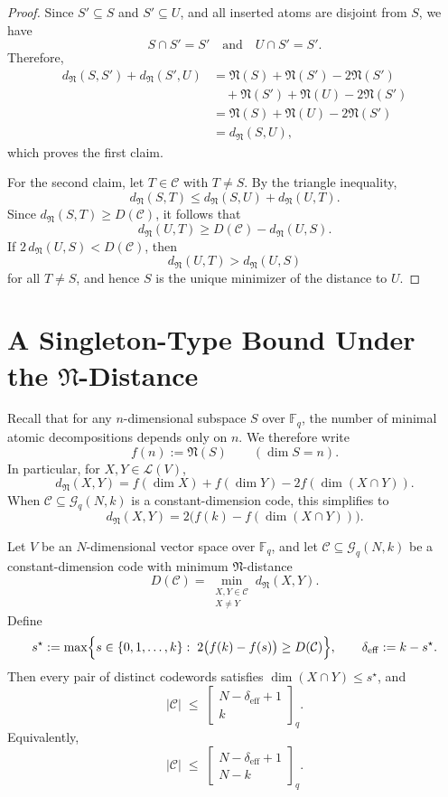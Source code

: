 \documentclass{svproc}
\begin{document}
\begin{proof}
Since $S' \subseteq S$ and $S' \subseteq U$, and all inserted atoms are disjoint
from $S$, we have
\[
S \cap S' = S' \quad\text{and}\quad U \cap S' = S'.
\]
Therefore,
\begin{align*}
d_{\mathfrak N}(S,S') + d_{\mathfrak N}(S',U)
&= \mathfrak N(S) + \mathfrak N(S') - 2\mathfrak N(S') \\
&\quad + \mathfrak N(S') + \mathfrak N(U) - 2\mathfrak N(S') \\
&= \mathfrak N(S) + \mathfrak N(U) - 2\mathfrak N(S') \\
&= d_{\mathfrak N}(S,U),
\end{align*}
which proves the first claim.

For the second claim, let $T\in\mathcal C$ with $T\neq S$.
By the triangle inequality,
\[
d_{\mathfrak N}(S,T)
\le
d_{\mathfrak N}(S,U) + d_{\mathfrak N}(U,T).
\]
Since $d_{\mathfrak N}(S,T) \ge D(\mathcal C)$, it follows that
\[
d_{\mathfrak N}(U,T)
\ge
D(\mathcal C) - d_{\mathfrak N}(U,S).
\]
If $2\,d_{\mathfrak N}(U,S) < D(\mathcal C)$, then
\[
d_{\mathfrak N}(U,T) > d_{\mathfrak N}(U,S)
\]
for all $T\neq S$, and hence $S$ is the unique minimizer of the distance to $U$.
\end{proof}

\section{A Singleton-Type Bound Under the $\mathfrak N$-Distance}\label{sec:singleton-bound}


Recall that for any $n$-dimensional subspace $S$ over $\mathbb F_q$, the number of
minimal atomic decompositions depends only on $n$.
We therefore write
\[
f(n) := \mathfrak N(S)\qquad ( \dim S = n).
\]
In particular, for $X,Y\in\mathcal L(V)$,
\[
d_{\mathfrak N}(X,Y)
=
f(\dim X)+f(\dim Y)-2f(\dim(X\cap Y)).
\]
When $\mathcal C\subseteq \mathcal G_q(N,k)$ is a constant-dimension code, this simplifies to
\[
d_{\mathfrak N}(X,Y)=2\bigl(f(k)-f(\dim(X\cap Y))\bigr).
\]

\begin{theorem}\label{thm:singleton}
Let $V$ be an $N$-dimensional vector space over $\mathbb F_q$, and let
$\mathcal C\subseteq \mathcal G_q(N,k)$ be a constant-dimension code with minimum
$\mathfrak N$-distance
\[
D(\mathcal C)=\min_{\substack{X,Y\in\mathcal C\\X\neq Y}} d_{\mathfrak N}(X,Y).
\]
Define
\[
s^\star
:=
\max\Bigl\{s\in\{0,1,\dots,k\}:\; 2\bigl(f(k)-f(s)\bigr)\ge D(\mathcal C)\Bigr\},
\qquad
\delta_{\mathrm{eff}}:=k-s^\star.
\]
Then every pair of distinct codewords satisfies $\dim(X\cap Y)\le s^\star$, and
\[
|\mathcal C|
\;\le\;
\left[\!\!\begin{array}{c}
N-\delta_{\mathrm{eff}}+1\\[2pt]
k
\end{array}\!\!\right]_q.
\]
Equivalently,
\[
|\mathcal C|
\;\le\;
\left[\!\!\begin{array}{c}
N-\delta_{\mathrm{eff}}+1\\[2pt]
N-k
\end{array}\!\!\right]_q.
\]
\end{theorem}
\end{document}

